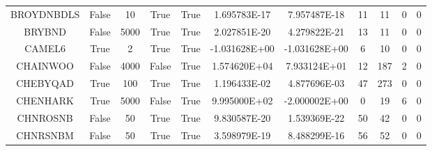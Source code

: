 \begin{longtable}{ccccccccccc}
	\cellcolor{default1} BROYDNBDLS& \cellcolor{default1} False& \cellcolor{default1} 10& \cellcolor{default1} True& \cellcolor{default1} True& \cellcolor{ok} 1.695783E-17& \cellcolor{best} 7.957487E-18& \cellcolor{best} 11& \cellcolor{best} 11& \cellcolor{default1} 0& \cellcolor{default1} 0\\
	\cellcolor{default2} BRYBND& \cellcolor{default2} False& \cellcolor{default2} 5000& \cellcolor{default2} True& \cellcolor{default2} True& \cellcolor{ok} 2.027851E-20& \cellcolor{best} 4.279822E-21& \cellcolor{ok} 13& \cellcolor{best} 11& \cellcolor{default2} 0& \cellcolor{default2} 0\\
	\cellcolor{default1} CAMEL6& \cellcolor{default1} True& \cellcolor{default1} 2& \cellcolor{default1} True& \cellcolor{default1} True& \cellcolor{best} -1.031628E+00& \cellcolor{ok} -1.031628E+00& \cellcolor{best} 6& \cellcolor{ok} 10& \cellcolor{default1} 0& \cellcolor{default1} 0\\
	\cellcolor{default2} CHAINWOO& \cellcolor{default2} False& \cellcolor{default2} 4000& \cellcolor{default2} False& \cellcolor{default2} True& \cellcolor{poor} 1.574620E+04& \cellcolor{best} 7.933124E+01& \cellcolor{best} 12& \cellcolor{poor} 187& \cellcolor{default2} 2& \cellcolor{default2} 0\\
	\cellcolor{default1} CHEBYQAD& \cellcolor{default1} True& \cellcolor{default1} 100& \cellcolor{default1} True& \cellcolor{default1} True& \cellcolor{poor} 1.196433E-02& \cellcolor{best} 4.877696E-03& \cellcolor{best} 47& \cellcolor{poor} 273& \cellcolor{default1} 0& \cellcolor{default1} 0\\
	\cellcolor{default2} CHENHARK& \cellcolor{default2} True& \cellcolor{default2} 5000& \cellcolor{default2} False& \cellcolor{default2} True& \cellcolor{poor} 9.995000E+02& \cellcolor{best} -2.000002E+00& \cellcolor{best} 0& \cellcolor{poor} 19& \cellcolor{default2} 6& \cellcolor{default2} 0\\
	\cellcolor{default1} CHNROSNB& \cellcolor{default1} False& \cellcolor{default1} 50& \cellcolor{default1} True& \cellcolor{default1} True& \cellcolor{ok} 9.830587E-20& \cellcolor{best} 1.539369E-22& \cellcolor{ok} 50& \cellcolor{best} 42& \cellcolor{default1} 0& \cellcolor{default1} 0\\
	\cellcolor{default2} CHNRSNBM& \cellcolor{default2} False& \cellcolor{default2} 50& \cellcolor{default2} True& \cellcolor{default2} True& \cellcolor{best} 3.598979E-19& \cellcolor{ok} 8.488299E-16& \cellcolor{ok} 56& \cellcolor{best} 52& \cellcolor{default2} 0& \cellcolor{default2} 0\\

\end{longtable}

